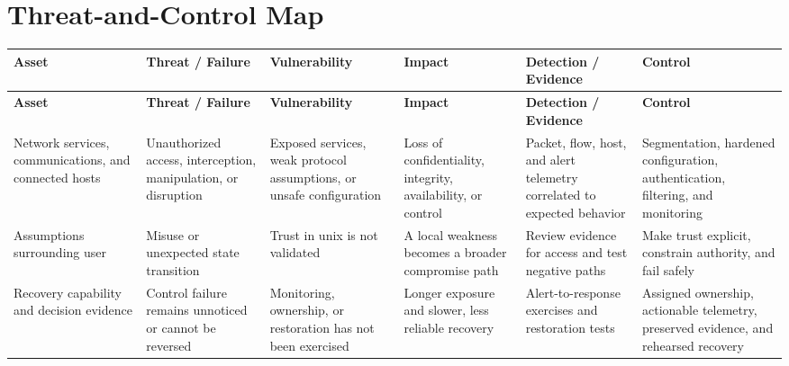 \documentclass[11pt,letterpaper]{article}
\begin{document}
\section*{Threat-and-Control Map}
\begingroup\scriptsize\setlength{\tabcolsep}{2pt}
\begin{longtable}{>{\raggedright\arraybackslash}p{}>{\raggedright\arraybackslash}p{}>{\raggedright\arraybackslash}p{}>{\raggedright\arraybackslash}p{}>{\raggedright\arraybackslash}p{}>{\raggedright\arraybackslash}p{}}
\toprule\rowcolor{Navy}\color{white}\textbf{Asset} & \color{white}\textbf{Threat / Failure} & \color{white}\textbf{Vulnerability} & \color{white}\textbf{Impact} & \color{white}\textbf{Detection / Evidence} & \color{white}\textbf{Control}\\\midrule
\endfirsthead
\toprule\rowcolor{Navy}\color{white}\textbf{Asset} & \color{white}\textbf{Threat / Failure} & \color{white}\textbf{Vulnerability} & \color{white}\textbf{Impact} & \color{white}\textbf{Detection / Evidence} & \color{white}\textbf{Control}\\\midrule
\endhead
Network services, communications, and connected hosts & Unauthorized access, interception, manipulation, or disruption & Exposed services, weak protocol assumptions, or unsafe configuration & Loss of confidentiality, integrity, availability, or control & Packet, flow, host, and alert telemetry correlated to expected behavior & Segmentation, hardened configuration, authentication, filtering, and monitoring\\\midrule
Assumptions surrounding user & Misuse or unexpected state transition & Trust in unix is not validated & A local weakness becomes a broader compromise path & Review evidence for access and test negative paths & Make trust explicit, constrain authority, and fail safely\\\midrule
Recovery capability and decision evidence & Control failure remains unnoticed or cannot be reversed & Monitoring, ownership, or restoration has not been exercised & Longer exposure and slower, less reliable recovery & Alert-to-response exercises and restoration tests & Assigned ownership, actionable telemetry, preserved evidence, and rehearsed recovery\\\midrule
\bottomrule
\end{longtable}
\endgroup
\end{document}
